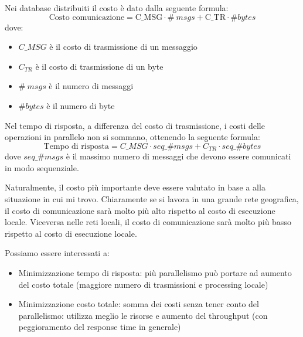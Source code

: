 Nei database distribuiti il costo è dato dalla seguente formula:
\begin{equation*}
      \text{Costo comunicazione} = \text{C\_{MSG}} \cdot \#\ msgs  + \text{C\_{TR}} \cdot \#bytes
\end{equation*}
dove:
\begin{itemize}
      \item \textbf{$C\_{MSG}$} è il costo di trasmissione di un messaggio
      \item \textbf{$C_{TR}$} è il costo di trasmissione di un byte
      \item \textbf{$\#\ msgs$} è il numero di messaggi
      \item \textbf{$\#bytes$} è il numero di byte
\end{itemize}
Nel tempo di risposta, a differenza del costo di trasmissione, i costi delle
operazioni in parallelo non si sommano, ottenendo la seguente formula:
\begin{equation*}
      \text{Tempo di risposta} = C\_{MSG} \cdot seq\_\#msgs + C_{TR} \cdot seq\_\#bytes
\end{equation*}
dove $seq\_\#msgs$ è il massimo numero di messaggi che devono essere comunicati
in modo sequenziale.

Naturalmente, il costo più importante deve essere valutato in base a alla
situazione in cui mi trovo. Chiaramente se si lavora in una grande rete
geografica, il costo di comunicazione sarà molto più alto rispetto al costo di
esecuzione locale. Viceversa nelle reti locali, il costo di comunicazione sarà
molto più basso rispetto al costo di esecuzione locale.

Possiamo essere interessati a:
\begin{itemize}
      \item Minimizzazione tempo di risposta: più parallelismo può portare ad
            aumento del costo totale (maggiore numero di trasmissioni e
            processing locale)
      \item Minimizzazione costo totale: somma dei costi senza tener conto del
            parallelismo: utilizza meglio le risorse e aumento del throughput (con
            peggioramento del response time in generale)
\end{itemize}
